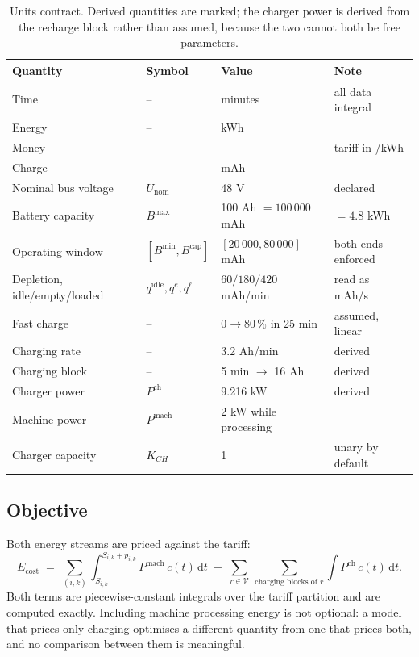 \documentclass[preprint, 3p, review, 12pt]{elsarticle}
\providecommand{\euro}{\texteuro}
\theoremstyle{definition}
\begin{document}
\begin{table}[t]
\centering
\small
\caption{Units contract. Derived quantities are marked; the charger power is derived from
the recharge block rather than assumed, because the two cannot both be free parameters.}
\label{tab:units}
\begin{tabular}{@{}llll@{}}
\toprule
Quantity & Symbol & Value & Note \\
\midrule
Time                       & --                 & minutes                & all data integral \\
Energy                     & --                 & kWh                    & \\
Money                      & --                 & \euro                  & tariff in \euro/kWh \\
Charge                     & --                 & mAh                    & \\
Nominal bus voltage        & $U_{\mathrm{nom}}$ & 48 V                   & declared \\
Battery capacity           & $B^{\max}$         & 100 Ah $=100\,000$ mAh & $=4.8$ kWh \\
Operating window           & $[B^{\min},B^{\mathrm{cap}}]$ & $[20\,000, 80\,000]$ mAh & both ends enforced \\
Depletion, idle/empty/loaded & $q^{\mathrm{idle}},q^{e},q^{\ell}$ & $60/180/420$ mAh/min & read as mAh/s \\
Fast charge                & --                 & $0\to80\,\%$ in 25 min & assumed, linear \\
Charging rate              & --                 & 3.2 Ah/min             & derived \\
Charging block             & --                 & 5 min $\to$ 16 Ah      & derived \\
Charger power              & $P^{\mathrm{ch}}$  & 9.216 kW               & derived \\
Machine power              & $P^{\mathrm{mach}}$& 2 kW while processing  & \citet{VISWANATHAN20221409} \\
Charger capacity           & $K_{CH}$           & 1                      & unary by default \\
\bottomrule
\end{tabular}
\end{table}

\subsection{Objective}
\label{sec:objective}
Both energy streams are priced against the tariff:
\begin{equation}
E_{\mathrm{cost}} \;=\;
\sum_{(i,k)}\int_{S_{i,k}}^{S_{i,k}+p_{i,k}} P^{\mathrm{mach}}\,c(t)\,\mathrm{d}t
\;+\;
\sum_{r\in\mathcal{V}}\ \sum_{\text{charging blocks of } r}\int P^{\mathrm{ch}}\,c(t)\,\mathrm{d}t .
\label{eq:ecost}
\end{equation}
Both terms are piecewise-constant integrals over the tariff partition and are computed
exactly. Including machine processing energy is not optional: a model that prices only
charging optimises a different quantity from one that prices both, and no comparison between
them is meaningful.
\end{document}
